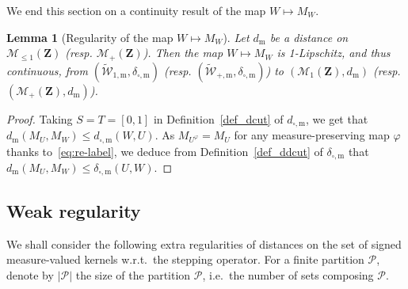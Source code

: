 \documentclass{amsart}
\newcommand{\wrt}{w.r.t.\ }
\newcommand{\ie}{i.e.\ }
\theoremstyle{plain}
\newtheorem{lemme}[Th]{Lemma}
\theoremstyle{definition}
\newcommand{\Space}{\mathbf{Z}}
\newcommand{\cP}{\mathcal{P}}
\newcommand{\Proba}{\mathcal{M}_1(\Space)}
\newcommand{\SubProba}{\mathcal{M}_{\leq1}(\Space)}
\newcommand{\Meas}{\mathcal{M}_+(\Space)}
\newcommand{\UGraphonm}{\widetilde{\mathcal{W}}_{1,\m}}
\newcommand{\UKernelpm}{\widetilde{\mathcal{W}}_{+,\m}}
\newcommand{\m}{\mathrm{m}}
\newcommand{\dmeas}{d_\m}
\newcommand{\dcut}{d_{\square,\m}}
\newcommand{\ddcut}{\delta_{\square,\m}}
\begin{document}
We end this section on a continuity result of the map $W \mapsto M_W$. 


\begin{lemme}[Regularity of the map $W \mapsto M_W$]
  \label{conv_graphon_conv_measure}
  Let  $\dmeas$  be  a  distance on  $\SubProba$ (resp. $\Meas$). Then
  the map $W\mapsto M_W$ is  1-Lipschitz, and thus continuous,  from $(\UGraphonm,
  \ddcut)$  (resp. $(\UKernelpm, \ddcut)$) to $(\Proba, \dmeas)$ (resp. $(\Meas, \dmeas)$). 
\end{lemme}
\begin{proof}
Taking $S=T=[0,1]$
in Definition~\eqref{def_dcut} of $\dcut$, we get that $\dmeas(M_U,M_W) \leq \dcut(W,U) $. 
As  $M_{U^\varphi}=M_U$ for any measure-preserving map $\varphi$
thanks to~\eqref{eq:re-label}, we deduce from Definition~\eqref{def_ddcut} of $\ddcut$ that 
$\dmeas(M_U,M_W) \leq \ddcut(U,W)$.
\end{proof}



\subsection{Weak regularity}
We shall consider the following extra regularities  of distances on the set of
signed measure-valued kernels \wrt the stepping operator. 
For a finite partition $\cP$, denote by $\vert\cP\vert$ the size of the partition $\cP$,
\ie the number of sets composing $\cP$.
\end{document}
